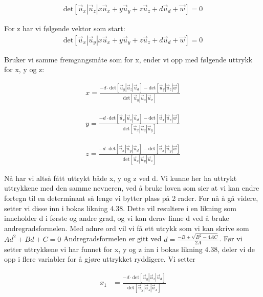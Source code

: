 \begin{align} \label{eq:detx}
	\text{det}[\vec{u}_x|\vec{u}_z |x\vec{u}_x + y\vec{u}_y + z\vec{u}_z + d\vec{u}_d + \vec{w}]=0
\end{align}

For z har vi følgende vektor som start: 
\begin{align} \label{eq:detx}
	\text{det}[\vec{u}_x|\vec{u}_y |x\vec{u}_x + y\vec{u}_y + z\vec{u}_z + d\vec{u}_d + \vec{w}]=0
\end{align}

Bruker vi samme fremgangsmåte som for x, ender vi opp med følgende uttrykk for x, y og z: 

\begin{align}
    x=\frac{-d\cdot\text{det}[\vec{u}_y|\vec{u}_z | \vec{u}_d] 
	-\text{det}[\vec{u}_y|\vec{u}_z | \vec{w}]}{\text{det}[\vec{u}_y|\vec{u}_z | \vec{u}_x]}
\end{align}

\begin{align}
    y=\frac{-d\cdot\text{det}[\vec{u}_x|\vec{u}_z | \vec{u}_d] 
	-\text{det}[\vec{u}_x|\vec{u}_z | \vec{w}]}{\text{det}[\vec{u}_x|\vec{u}_z | \vec{u}_y]}
\end{align}

\begin{align}
    z=\frac{-d\cdot\text{det}[\vec{u}_x|\vec{u}_y | \vec{u}_d] 
	-\text{det}[\vec{u}_x|\vec{u}_y | \vec{w}]}{\text{det}[\vec{u}_x|\vec{u}_y | \vec{u}_z]}
\end{align}

Nå har vi altså fått uttrykt både x, y og z ved d. Vi kunne her ha uttrykt uttrykkene med den samme nevneren, ved å bruke loven som sier at vi kan endre fortegn til en determinant så lenge vi bytter plass på 2 rader\cite{TheDeterminant}. For nå å gå videre, setter vi disse inn i bokas likning 4.38. Dette vil resultere i en likning som inneholder d i første og andre grad, og vi kan derav finne d ved å bruke andregradsformelen. Med adnre ord vil vi få ett utrykk som vi kan skrive som $Ad^2+Bd+C=0$ Andregradsformelen er gitt ved $d=\frac{-B \pm \sqrt{B^2-4AC}}{2A}$. Før vi setter uttrykkene vi har funnet for x, y og z inn i bokas likning 4.38, deler vi de opp i flere variabler for å gjøre uttrykket ryddigere. Vi setter

\begin{align}
	x_1&=\frac{-d\cdot\text{det}[\vec{u}_y|\vec{u}_z | \vec{u}_d]}{\text{det}[\vec{u}_y|\vec{u}_z | \vec{u}_x]}\nonumber 
\end{align}

